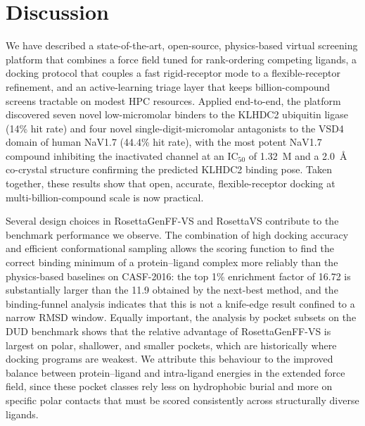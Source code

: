 \documentclass[11pt]{article}
\begin{document}
\section{Discussion}

We have described a state-of-the-art, open-source, physics-based virtual
screening platform that combines a force field tuned for
rank-ordering competing ligands, a docking protocol that couples a fast
rigid-receptor mode to a flexible-receptor refinement, and an
active-learning triage layer that keeps billion-compound screens
tractable on modest HPC resources. Applied end-to-end, the platform
discovered seven novel low-micromolar binders to the KLHDC2 ubiquitin
ligase (14\% hit rate) and four novel single-digit-micromolar antagonists
to the VSD4 domain of human NaV1.7 (44.4\% hit rate), with the most
potent NaV1.7 compound inhibiting the inactivated channel at an
IC$_{50}$ of 1.32~\textmu M and a 2.0~\AA{} co-crystal structure
confirming the predicted KLHDC2 binding pose. Taken together, these
results show that open, accurate, flexible-receptor docking at
multi-billion-compound scale is now practical.

Several design choices in RosettaGenFF-VS and RosettaVS contribute to
the benchmark performance we observe. The combination of high docking
accuracy and efficient conformational sampling allows the scoring
function to find the correct binding minimum of a protein--ligand
complex more reliably than the physics-based baselines on CASF-2016:
the top 1\% enrichment factor of 16.72 is substantially larger than the
11.9 obtained by the next-best method, and the binding-funnel analysis
indicates that this is not a knife-edge result confined to a narrow RMSD
window. Equally important, the analysis by pocket subsets on the DUD
benchmark shows that the relative advantage of RosettaGenFF-VS is largest
on polar, shallower, and smaller pockets, which are historically where
docking programs are weakest. We attribute this behaviour to the
improved balance between protein--ligand and intra-ligand energies in
the extended force field, since these pocket classes rely less on
hydrophobic burial and more on specific polar contacts that must be
scored consistently across structurally diverse ligands.
\end{document}
